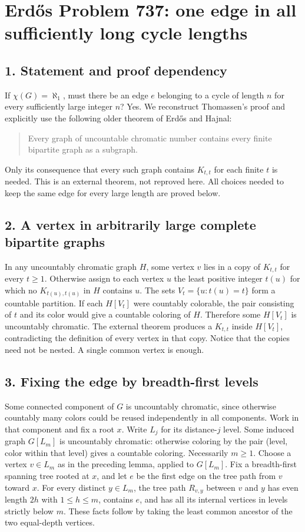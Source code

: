 \section*{Erd\H{o}s Problem 737: one edge in all sufficiently long cycle lengths}
\subsection*{1. Statement and proof dependency}
If $\chi(G)=\aleph_1$, must there be an edge $e$ belonging to a cycle of length $n$ for every sufficiently large integer $n$? Yes. We reconstruct Thomassen's proof and explicitly use the following older theorem of Erd\H{o}s and Hajnal:
\begin{quote}
Every graph of uncountable chromatic number contains every finite bipartite graph as a subgraph.
\end{quote}
Only its consequence that every such graph contains $K_{t,t}$ for each finite $t$ is needed. This is an external theorem, not reproved here. All choices needed to keep the same edge for every large length are proved below.
\subsection*{2. A vertex in arbitrarily large complete bipartite graphs}
In any uncountably chromatic graph $H$, some vertex $v$ lies in a copy of $K_{t,t}$ for every $t\ge1$. Otherwise assign to each vertex $u$ the least positive integer $t(u)$ for which no $K_{t(u),t(u)}$ in $H$ contains $u$. The sets $V_t=\{u:t(u)=t\}$ form a countable partition. If each $H[V_t]$ were countably colorable, the pair consisting of $t$ and its color would give a countable coloring of $H$. Therefore some $H[V_t]$ is uncountably chromatic. The external theorem produces a $K_{t,t}$ inside $H[V_t]$, contradicting the definition of every vertex in that copy.
Notice that the copies need not be nested. A single common vertex is enough.
\subsection*{3. Fixing the edge by breadth-first levels}
Some connected component of $G$ is uncountably chromatic, since otherwise countably many colors could be reused independently in all components. Work in that component and fix a root $x$. Write $L_j$ for its distance-$j$ level. Some induced graph $G[L_m]$ is uncountably chromatic: otherwise coloring by the pair (level, color within that level) gives a countable coloring. Necessarily $m\ge1$.
Choose a vertex $v\in L_m$ as in the preceding lemma, applied to $G[L_m]$. Fix a breadth-first spanning tree rooted at $x$, and let $e$ be the first edge on the tree path from $v$ toward $x$. For every distinct $y\in L_m$, the tree path $R_{v,y}$ between $v$ and $y$ has even length $2h$ with $1\le h\le m$, contains $e$, and has all its internal vertices in levels strictly below $m$. These facts follow by taking the least common ancestor of the two equal-depth vertices.
